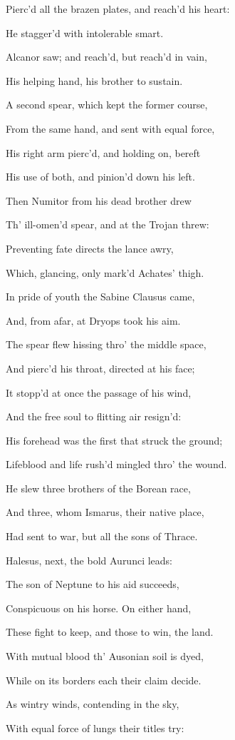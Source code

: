 Pierc’d all the brazen plates, and reach’d his heart:

He stagger’d with intolerable smart.

Alcanor saw; and reach’d, but reach’d in vain,

His helping hand, his brother to sustain.

A second spear, which kept the former course,

From the same hand, and sent with equal force,

His right arm pierc’d, and holding on, bereft

His use of both, and pinion’d down his left.

Then Numitor from his dead brother drew

Th’ ill-omen’d spear, and at the Trojan threw:

Preventing fate directs the lance awry,

Which, glancing, only mark’d Achates’ thigh.

In pride of youth the Sabine Clausus came,

And, from afar, at Dryops took his aim.

The spear flew hissing thro’ the middle space,

And pierc’d his throat, directed at his face;

It stopp’d at once the passage of his wind,

And the free soul to flitting air resign’d:

His forehead was the first that struck the ground;

Lifeblood and life rush’d mingled thro’ the wound.

He slew three brothers of the Borean race,

And three, whom Ismarus, their native place,

Had sent to war, but all the sons of Thrace.

Halesus, next, the bold Aurunci leads:

The son of Neptune to his aid succeeds,

Conspicuous on his horse. On either hand,

These fight to keep, and those to win, the land.

With mutual blood th’ Ausonian soil is dyed,

While on its borders each their claim decide.

As wintry winds, contending in the sky,

With equal force of lungs their titles try:


